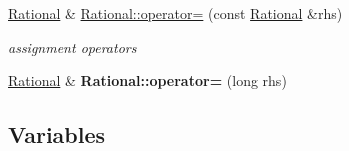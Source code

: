 \begin{DoxyCompactItemize}
\mbox{\label{group__general_ga1f7f9f9491bbe7f24c488a505ac6887c}} 
\mbox{\hyperlink{classRational}{Rational}} \& \mbox{\hyperlink{group__general_ga1f7f9f9491bbe7f24c488a505ac6887c}{Rational\+::operator=}} (const \mbox{\hyperlink{classRational}{Rational}} \&rhs)
\begin{DoxyCompactList}\small\item\em assignment operators \end{DoxyCompactList}\item 
\mbox{\label{group__general_ga019d7a6ea6fb10e582310ae8f00a121c}} 
\mbox{\hyperlink{classRational}{Rational}} \& {\bfseries Rational\+::operator=} (long rhs)
\end{DoxyCompactItemize}
\subsection*{Variables}
